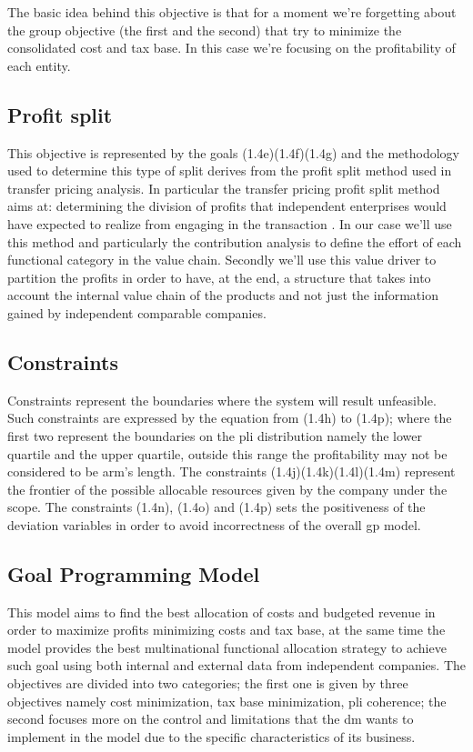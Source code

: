 \begin{doublespace}
The basic idea behind this objective is that for a moment we're forgetting about the group objective (the first and the second) that try to minimize the consolidated cost and tax base. In this case we're focusing on the profitability of each entity.

\subsection{Profit split}
This objective is represented by the goals (1.4e)(1.4f)(1.4g) and the methodology used to determine this type of split derives from the profit split method used in transfer pricing analysis. In particular the transfer pricing profit split method aims at: determining the division of profits that independent enterprises would have expected to realize from engaging in the transaction \cite{OECD_ProfitSplit_2017}. In our case we'll use this method and particularly the contribution analysis to define the effort of each functional category in the value chain. Secondly we'll use this value driver to partition the profits in order to have, at the end, a structure that takes into account the internal value chain of the products and not just the information gained by independent comparable companies.


\subsection{Constraints}
Constraints represent the boundaries where the system will result unfeasible. Such constraints are expressed by the equation from (1.4h) to (1.4p); where the first two represent the boundaries on the \gls{pli} distribution namely the lower quartile and the upper quartile, outside this range the profitability may not be considered to be arm's length. The constraints (1.4j)(1.4k)(1.4l)(1.4m) represent the frontier of the possible allocable resources given by the company under the scope. The constraints (1.4n), (1.4o) and (1.4p) sets the positiveness of the deviation variables in order to avoid incorrectness of the overall \gls{gp} model.

\subsection{Goal Programming Model}

This model aims to find the best allocation of costs and budgeted revenue in order to maximize profits minimizing costs and tax base, at the same time the model provides the best multinational functional allocation strategy to achieve such goal using both internal and external data from independent companies.
The objectives are divided into two categories; the first one is given by three objectives namely cost minimization, tax base minimization, \gls{pli} coherence; the second focuses more on the control and limitations that the \gls{dm} wants to implement in the model due to the specific characteristics of its business.


\end{doublespace}
